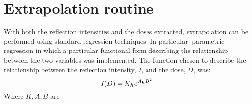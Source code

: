 \section{Extrapolation routine}
\label{sec:Extrapolation routine}
With both the reflection intensities and the doses extracted, extrapolation can be performed using standard regression techniques.
In particular, parametric regression in which a particular functional form describing the relationship between the two variables was implemented.
The function chosen to describe the relationship between the reflection intensity, $I$, and the dose, $D$, was:
\begin{equation}
    I(D) = K_{\boldsymbol{h}} e^{A_{\boldsymbol{h}}D^2}
    \label{eq:Extrapolation regression function}
\end{equation}
Where $K, A, B$ are
